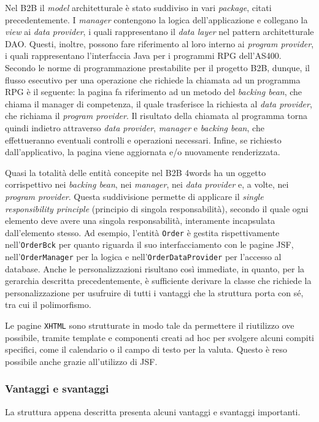 Nel B2B il \textit{model} architetturale è stato suddiviso in vari \textit{package}, citati precedentemente. I \textit{manager} contengono la logica dell'applicazione e collegano la \textit{view} ai \textit{data provider}, i quali rappresentano il \textit{data layer} nel pattern architetturale \Gls{DAO}. Questi, inoltre, possono fare riferimento al loro interno ai \textit{program provider}, i quali rappresentano l'interfaccia Java per i programmi \Gls{RPG} dell'\Gls{AS400}. Secondo le norme di programmazione prestabilite per il progetto B2B, dunque, il flusso esecutivo per una operazione che richiede la chiamata ad un programma RPG è il seguente: la pagina fa riferimento ad un metodo del \textit{backing bean}, che chiama il manager di competenza, il quale trasferisce la richiesta al \textit{data provider}, che richiama il \textit{program provider}. Il risultato della chiamata al programma torna quindi indietro attraverso \textit{data provider}, \textit{manager} e \textit{backing bean}, che effettueranno eventuali controlli e operazioni necessari. Infine, se richiesto dall'applicativo, la pagina viene aggiornata e/o nuovamente renderizzata.

Quasi la totalità delle entità concepite nel B2B 4words ha un oggetto corrispettivo nei \textit{backing bean}, nei \textit{manager}, nei \textit{data provider} e, a volte, nei \textit{program provider}. Questa suddivisione permette di applicare il \textit{single responsibility principle} (principio di singola responsabilità), secondo il quale ogni elemento deve avere una singola responsabilità, interamente incapsulata dall'elemento stesso. Ad esempio, l'entità \texttt{Order} è gestita rispettivamente nell'\texttt{OrderBck} per quanto riguarda il suo interfacciamento con le pagine JSF, nell'\texttt{OrderManager} per la logica e nell'\texttt{OrderDataProvider} per l'accesso al database. Anche le personalizzazioni risultano così immediate, in quanto, per la gerarchia descritta precedentemente, è sufficiente derivare la classe che richiede la personalizzazione per usufruire di tutti i vantaggi che la struttura porta con sé, tra cui il polimorfismo.

Le pagine \texttt{XHTML} sono strutturate in modo tale da permettere il riutilizzo ove possibile, tramite template e componenti creati ad hoc per svolgere alcuni compiti specifici, come il calendario o il campo di testo per la valuta. Questo è reso possibile anche grazie all'utilizzo di JSF.

\subsubsection{Vantaggi e svantaggi}
La struttura appena descritta presenta alcuni vantaggi e svantaggi importanti.
